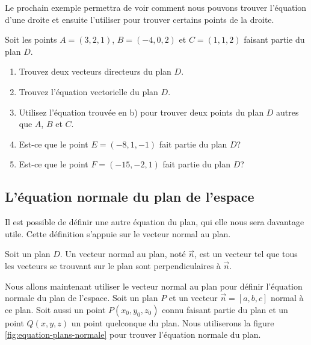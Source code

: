 \documentclass[]{book}
\providecommand{\tightlist}{%
  \setlength{\itemsep}{0pt}\setlength{\parskip}{0pt}}
\theoremstyle{definition}
\theoremstyle{definition}
\theoremstyle{definition}
\theoremstyle{remark}
\let\BeginKnitrBlock\begin \let\EndKnitrBlock\end
\begin{document}
Le prochain exemple permettra de voir comment nous pouvons trouver l'équation d'une droite et ensuite l'utiliser pour trouver certains points de la droite.

\BeginKnitrBlock{example}
\protect\hypertarget{exm:unnamed-chunk-218}{}{\label{exm:unnamed-chunk-218} }Soit les points \(A=(3,2,1)\), \(B=(-4,0,2)\) et \(C=(1,1,2)\) faisant partie du plan \(D\).

\begin{enumerate}
\def\labelenumi{\alph{enumi}.}
\tightlist
\item
  Trouvez deux vecteurs directeurs du plan \(D\).
\item
  Trouvez l'équation vectorielle du plan \(D\).
\item
  Utilisez l'équation trouvée en b) pour trouver deux points du plan \(D\) autres que \(A\), \(B\) et \(C\).
\item
  Est-ce que le point \(E=(-8,1,-1)\) fait partie du plan \(D\)?
\item
  Est-ce que le point \(F=(-15,-2,1)\) fait partie du plan \(D\)?
\end{enumerate}
\EndKnitrBlock{example}

\hypertarget{luxe9quation-normale-du-plan-de-lespace}{%
\subsection{L'équation normale du plan de l'espace}\label{luxe9quation-normale-du-plan-de-lespace}}

Il est possible de définir une autre équation du plan, qui elle nous sera davantage utile. Cette définition s'appuie sur le vecteur normal au plan.

\BeginKnitrBlock{definition}[Le vecteur normal au plan]
\protect\hypertarget{def:unnamed-chunk-219}{}{\label{def:unnamed-chunk-219} {} }Soit un plan \(D\). Un vecteur normal au plan, noté \(\vec n\), est un vecteur tel que tous les vecteurs se trouvant sur le plan sont perpendiculaires à \(\vec n\).
\EndKnitrBlock{definition}

Nous allons maintenant utiliser le vecteur normal au plan pour définir l'équation normale du plan de l'espace. Soit un plan \(P\) et un vecteur \(\vec n=[a,b,c]\) normal à ce plan. Soit aussi un point \(P(x_0,y_0,z_0)\) connu faisant partie du plan et un point \(Q(x,y,z)\) un point quelconque du plan. Nous utiliserons la figure \ref{fig:equation-plans-normale} pour trouver l'équation normale du plan.
\end{document}
